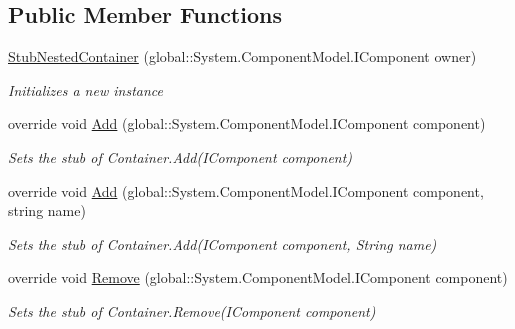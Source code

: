 \subsection*{Public Member Functions}
\begin{DoxyCompactItemize}
\item 
\hyperlink{class_system_1_1_component_model_1_1_fakes_1_1_stub_nested_container_a91239fb38a85aaad814f6c3dfd783f12}{Stub\-Nested\-Container} (global\-::\-System.\-Component\-Model.\-I\-Component owner)
\begin{DoxyCompactList}\small\item\em Initializes a new instance\end{DoxyCompactList}\item 
override void \hyperlink{class_system_1_1_component_model_1_1_fakes_1_1_stub_nested_container_a70a2729d41fce19ee1ec8b29d7835845}{Add} (global\-::\-System.\-Component\-Model.\-I\-Component component)
\begin{DoxyCompactList}\small\item\em Sets the stub of Container.\-Add(\-I\-Component component)\end{DoxyCompactList}\item 
override void \hyperlink{class_system_1_1_component_model_1_1_fakes_1_1_stub_nested_container_af299b16728d9eca8d5dbb46f4c956e7d}{Add} (global\-::\-System.\-Component\-Model.\-I\-Component component, string name)
\begin{DoxyCompactList}\small\item\em Sets the stub of Container.\-Add(\-I\-Component component, String name)\end{DoxyCompactList}\item 
override void \hyperlink{class_system_1_1_component_model_1_1_fakes_1_1_stub_nested_container_aa1191ca5b3dd6331951a07de20075d0a}{Remove} (global\-::\-System.\-Component\-Model.\-I\-Component component)
\begin{DoxyCompactList}\small\item\em Sets the stub of Container.\-Remove(\-I\-Component component)\end{DoxyCompactList}\end{DoxyCompactItemize}
